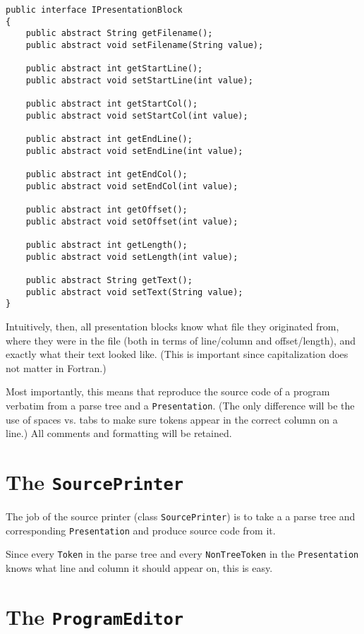 \begin{verbatim}
public interface IPresentationBlock
{
    public abstract String getFilename();
    public abstract void setFilename(String value);

    public abstract int getStartLine();
    public abstract void setStartLine(int value);

    public abstract int getStartCol();
    public abstract void setStartCol(int value);

    public abstract int getEndLine();
    public abstract void setEndLine(int value);

    public abstract int getEndCol();
    public abstract void setEndCol(int value);

    public abstract int getOffset();
    public abstract void setOffset(int value);

    public abstract int getLength();
    public abstract void setLength(int value);

    public abstract String getText();
    public abstract void setText(String value);
}
\end{verbatim}

Intuitively, then, all presentation blocks know what file they originated from,
where they were in the file (both in terms of line/column and offset/length),
and exactly what their text looked like.  (This is important since capitalization
does not matter in Fortran.)

Most importantly, this means that reproduce the source code of a program verbatim
from a parse tree and a \texttt{Presentation}.  (The only difference will be the
use of spaces vs. tabs to make sure tokens appear in the correct column on a line.)
All comments and formatting will be retained.

\section{The \texttt{SourcePrinter}}

The job of the source printer (class \texttt{SourcePrinter}) is to take a
a parse tree and corresponding \texttt{Presentation}
and produce source code from it.

Since every \texttt{Token} in the parse tree and every \texttt{NonTreeToken}
in the \texttt{Presentation} knows what line and column it should appear on,
this is easy.

\section{The \texttt{ProgramEditor}}

